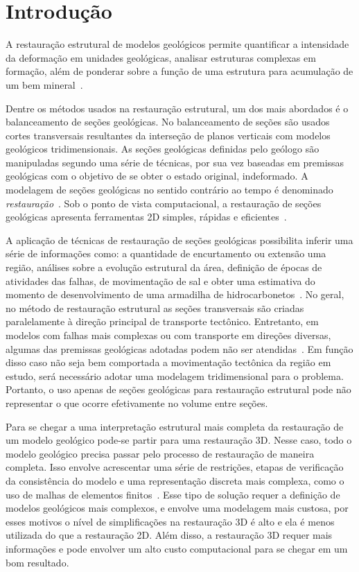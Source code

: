 
\chapter{Introdução}

A restauração estrutural de modelos geológicos permite quantificar a intensidade da deformação em unidades geológicas, analisar estruturas complexas em formação, além de ponderar sobre a função de uma estrutura para acumulação de um bem mineral~\cite{GarciaTese}.

Dentre os métodos usados na restauração estrutural, um dos mais abordados é o balanceamento de seções geológicas. No balanceamento de seções são usados cortes transversais resultantes da interseção de planos verticais com modelos geológicos tridimensionais. As seções geológicas definidas pelo geólogo são manipuladas segundo uma série de técnicas, por sua vez baseadas em premissas geológicas com o objetivo de se obter o estado original, indeformado. A modelagem de seções geológicas no sentido contrário ao tempo é denominado \emph{restauração}~\cite{Fossen}. Sob o ponto de vista computacional, a restauração de seções geológicas apresenta ferramentas 2D simples, rápidas e eficientes~\cite{GarciaTese}.

A aplicação de técnicas de restauração de seções geológicas possibilita inferir uma série de informações como: a quantidade de encurtamento ou extensão uma região, análises sobre a evolução estrutural da área, definição de épocas de atividades das falhas, de movimentação de sal e obter uma estimativa do momento de desenvolvimento de uma armadilha de hidrocarbonetos~\cite{DURANDRIARD-3D, Guedes}. No geral, no método de restauração estrutural as seções transversais são criadas paralelamente à direção principal de transporte tectônico. Entretanto, em modelos com falhas mais complexas ou com transporte em direções diversas, algumas das premissas geológicas adotadas podem não ser atendidas~\cite{GarciaTese}. Em função disso caso não seja bem comportada a movimentação tectônica da região em estudo, será necessário adotar uma modelagem tridimensional para o problema. Portanto, o uso apenas de seções geológicas para restauração estrutural pode não representar o que ocorre efetivamente no volume entre seções.

Para se chegar a uma interpretação estrutural mais completa da restauração de um modelo geológico pode-se partir para uma restauração 3D. Nesse caso, todo o modelo geológico precisa passar pelo processo de restauração de maneira completa. Isso envolve acrescentar uma série de restrições, etapas de verificação da consistência do modelo e uma representação discreta mais complexa, como o uso de malhas de elementos finitos~\cite{DURANDRIARD2010441}. Esse tipo de solução requer a definição de modelos geológicos mais complexos, e envolve uma modelagem mais custosa, por esses motivos o nível de simplificações na restauração 3D é alto e ela é menos utilizada do que a restauração 2D. Além disso, a restauração 3D requer mais informações e pode envolver um alto custo computacional para se chegar em um bom resultado.

